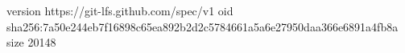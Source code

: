 version https://git-lfs.github.com/spec/v1
oid sha256:7a50e244eb7f16898c65ea892b2d2c5784661a5a6e27950daa366e6891a4fb8a
size 20148

